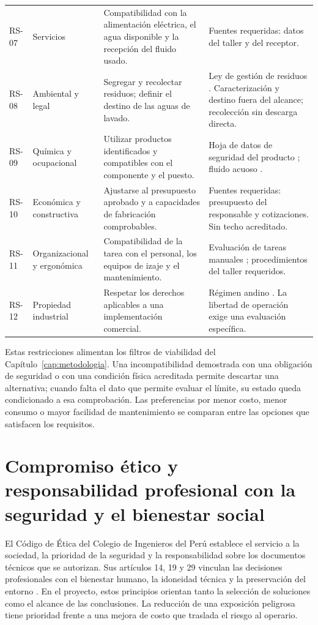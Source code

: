 \begin{longtable}{@{}p{1.1cm}>{\raggedright\arraybackslash}p{}>{\raggedright\arraybackslash}p{}>{\raggedright\arraybackslash}p{}@{}}
RS-07 & Servicios & Compatibilidad con la alimentación eléctrica, el agua disponible y la recepción del fluido usado. & Fuentes requeridas: datos del taller y del receptor. \\
RS-08 & Ambiental y legal & Segregar y recolectar residuos; definir el destino de las aguas de lavado. & Ley de gestión de residuos \cite{dleg1278}. Caracterización y destino fuera del alcance; recolección sin descarga directa. \\
RS-09 & Química y ocupacional & Utilizar productos identificados y compatibles con el componente y el puesto. & Hoja de datos de seguridad del producto \cite{ds024}; fluido acuoso \cite{en12921_2}. \\
RS-10 & Económica y constructiva & Ajustarse al presupuesto aprobado y a capacidades de fabricación comprobables. & Fuentes requeridas: presupuesto del responsable y cotizaciones. Sin techo acreditado. \\
RS-11 & Organizacional y ergonómica & Compatibilidad de la tarea con el personal, los equipos de izaje y el mantenimiento. & Evaluación de tareas manuales \cite{iso11228}; procedimientos del taller requeridos. \\
RS-12 & Propiedad industrial & Respetar los derechos aplicables a una implementación comercial. & Régimen andino \cite{can486}. La libertad de operación exige una evaluación específica. \\
\end{longtable}
\endgroup

Estas restricciones alimentan los filtros de viabilidad del Capítulo~\ref{cap:metodologia}. Una incompatibilidad demostrada con una obligación de seguridad o con una condición física acreditada permite descartar una alternativa; cuando falta el dato que permite evaluar el límite, su estado queda condicionado a esa comprobación. Las preferencias por menor costo, menor consumo o mayor facilidad de mantenimiento se comparan entre las opciones que satisfacen los requisitos.

\section{Compromiso ético y responsabilidad profesional con la seguridad y el bienestar social}

El Código de Ética del Colegio de Ingenieros del Perú establece el servicio a la sociedad, la prioridad de la seguridad y la responsabilidad sobre los documentos técnicos que se autorizan. Sus artículos 14, 19 y 29 vinculan las decisiones profesionales con el bienestar humano, la idoneidad técnica y la preservación del entorno \cite{cip2018}. En el proyecto, estos principios orientan tanto la selección de soluciones como el alcance de las conclusiones. La reducción de una exposición peligrosa tiene prioridad frente a una mejora de costo que traslada el riesgo al operario.

